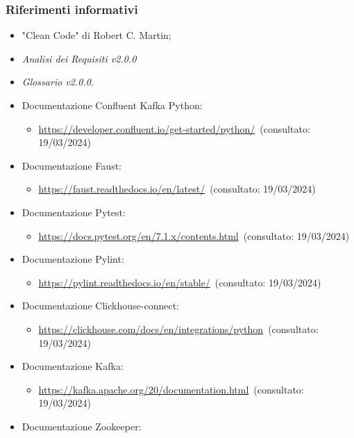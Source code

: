 \subsubsection{Riferimenti informativi}
\begin{itemize}
    \item "Clean Code" di Robert C. Martin;
    \item \textit{Analisi dei Requisiti v2.0.0}
    \item \textit{Glossario v2.0.0}.
    \item Documentazione Confluent Kafka Python:
    \begin{itemize}
        \item \url{https://developer.confluent.io/get-started/python/}~(consultato: 19/03/2024)
    \end{itemize}
    \item Documentazione Faust: 
    \begin{itemize}
        \item \url{https://faust.readthedocs.io/en/latest/}~(consultato: 19/03/2024)
    \end{itemize}
    \item Documentazione Pytest: 
    \begin{itemize}
        \item \url{https://docs.pytest.org/en/7.1.x/contents.html}~(consultato: 19/03/2024)
    \end{itemize}
    \item Documentazione Pylint: 
    \begin{itemize}
        \item \url{https://pylint.readthedocs.io/en/stable/}~(consultato: 19/03/2024)
    \end{itemize}
    \item Documentazione Clickhouse-connect: 
    \begin{itemize}
        \item \url{https://clickhouse.com/docs/en/integrations/python}~(consultato: 19/03/2024)
    \end{itemize}
    \item Documentazione Kafka: 
    \begin{itemize}
        \item \url{https://kafka.apache.org/20/documentation.html}~(consultato: 19/03/2024)
    \end{itemize}
    \item Documentazione Zookeeper: 

\end{itemize}
